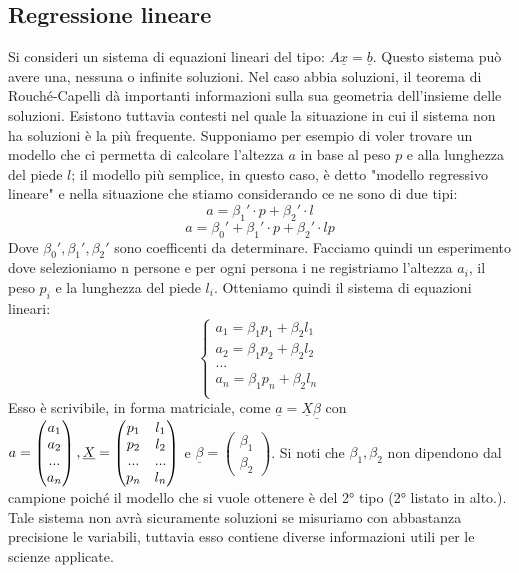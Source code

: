\documentclass[12pt]{article}
\newenvironment{para}{\begin{adjustwidth}{13mm}{}}{\end{adjustwidth}}
\begin{document}
\begin{para}
\section{Regressione lineare}
Si consideri un sistema di equazioni lineari del tipo: $A\underline{x} = \underline{b}$. Questo sistema può avere una, nessuna o infinite soluzioni. Nel caso abbia soluzioni, il teorema di Rouché-Capelli dà importanti informazioni sulla sua geometria dell'insieme delle soluzioni. Esistono tuttavia contesti nel quale la situazione in cui il sistema non ha soluzioni è la più frequente. Supponiamo per esempio di voler trovare un modello che ci permetta di calcolare l'altezza $a$ in base al peso $p$ e alla lunghezza del piede $l$; il modello più semplice, in questo caso, è detto "modello regressivo lineare" e nella situazione che stiamo considerando ce ne sono di due tipi: $$a = \beta_1'\cdot p + \beta_2' \cdot l$$
$$a = \beta_0'+\beta_1' \cdot p +\beta_2' \cdot l p$$
Dove $\beta_0', \beta_1', \beta_2'$ sono coefficenti da determinare. Facciamo quindi un esperimento dove selezioniamo n persone e per ogni persona i ne registriamo l'altezza $a_i$, il peso $p_i$ e la lunghezza del piede $l_i$. Otteniamo quindi il sistema di equazioni lineari: $$\begin{cases}
    a_1 = \beta_1 p_1 + \beta_2 l_1 \\
    a_2 = \beta_1 p_2 + \beta_2 l_2 \\
    ...\\
    a_n = \beta_1 p_n + \beta_2 l_n \\
\end{cases}$$
Esso è scrivibile, in forma matriciale, come $\underline{a} = \underline{X} \underline{\beta}$ con $a = \begin{pmatrix}
    a_1 \\
    a_2 \\
    ...\\
    a_n
\end{pmatrix}, \newline \underline{X} = \begin{pmatrix}
    p_1 & l_1 \\
    p_2 & l_2 \\
    ... & ...\\
    p_n & l_n
\end{pmatrix}$ e $\underline{\beta} = \begin{pmatrix}
    \beta_1 \\
    \beta_2
\end{pmatrix}$. Si noti che $\beta_1, \beta_2$ non dipendono dal campione poiché il modello che si vuole ottenere è del 2° tipo (2° listato in alto.). Tale sistema non avrà sicuramente soluzioni se misuriamo con abbastanza precisione le variabili, tuttavia esso contiene diverse informazioni utili per le scienze applicate.

\end{para}
\end{document}
